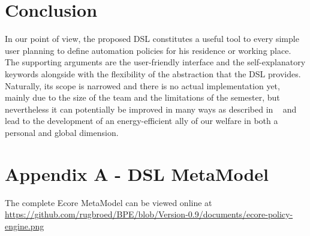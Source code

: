 \documentclass{llncs}
\begin{document}
\section{Conclusion}\label{sec:conclusion}
In our point of view, the proposed DSL constitutes a useful tool to every simple user planning to define automation policies for his residence or working place. The supporting arguments are the user-friendly interface and the self-explanatory keywords alongside with the flexibility of the abstraction that the DSL provides. Naturally, its scope is narrowed and there is no actual implementation yet, mainly due to the size of the team and the limitations of the semester, but nevertheless it can potentially be improved in many ways as described in ~ and lead to the development of an energy-efficient ally of our welfare in both a personal and global dimension.

{}


\section{Appendix A - DSL MetaModel}\label{app:a-metamodel}
The complete Ecore MetaModel can be viewed online at
\url{https://github.com/rugbroed/BPE/blob/Version-0.9/documents/ecore-policy-engine.png}





\end{document}
